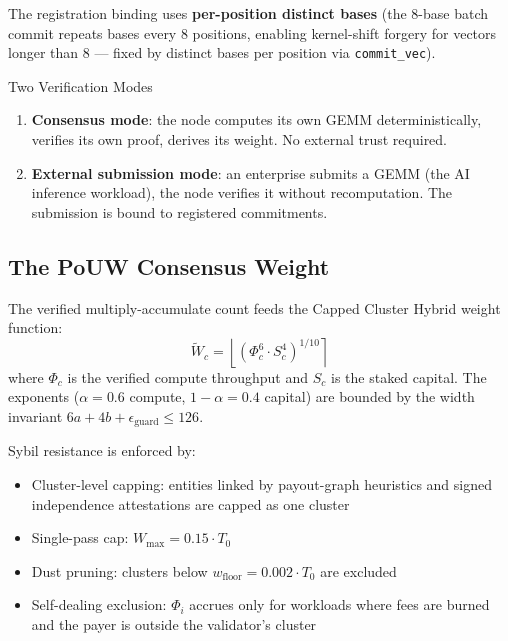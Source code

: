 \documentclass[11pt, a4paper]{article}
\theoremstyle{plain}
\theoremstyle{definition}
\theoremstyle{remark}
\begin{document}
The registration binding uses \textbf{per-position distinct bases}
(the 8-base batch commit repeats bases every 8 positions, enabling
kernel-shift forgery for vectors longer than 8 --- fixed by distinct
bases per position via \texttt{commit\_vec}).

\begin{infobox}{Two Verification Modes}
\begin{enumerate}
\item \textbf{Consensus mode}: the node computes its own GEMM
deterministically, verifies its own proof, derives its weight.
No external trust required.
\item \textbf{External submission mode}: an enterprise submits a GEMM
(the AI inference workload), the node verifies it without
recomputation. The submission is bound to registered commitments.
\end{enumerate}
\end{infobox}

\subsection{The PoUW Consensus Weight}

The verified multiply-accumulate count feeds the Capped Cluster Hybrid
weight function:
\begin{equation}
\tilde{W}_c = \left\lfloor (\Phi_c^6 \cdot S_c^4)^{1/10} \right\rceil
\end{equation}
where $\Phi_c$ is the verified compute throughput and $S_c$ is the
staked capital. The exponents ($\alpha = 0.6$ compute,
 $1-\alpha = 0.4$ capital) are bounded by the width invariant
 $6a + 4b + \epsilon_{\text{guard}} \le 126$.

Sybil resistance is enforced by:
\begin{itemize}
\item Cluster-level capping: entities linked by payout-graph heuristics
and signed independence attestations are capped as one cluster
\item Single-pass cap: $W_{\max} = 0.15 \cdot T_0$ \item Dust pruning: clusters below $w_{\text{floor}} = 0.002 \cdot T_0$ are excluded
\item Self-dealing exclusion: $\Phi_i$ accrues only for workloads
where fees are burned and the payer is outside the validator's cluster
\end{itemize}

\end{document}
